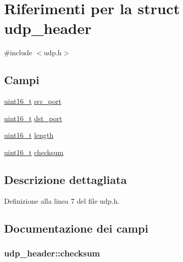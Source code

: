 \hypertarget{structudp__header}{\section{Riferimenti per la struct udp\+\_\+header}
\label{structudp__header}
}


{\ttfamily \#include $<$udp.\+h$>$}

\subsection*{Campi}
\begin{DoxyCompactItemize}
\item 
\hyperlink{aplus_8h_a5a8b2dc9e45a9ee81a94ef304fb62505}{uint16\+\_\+t} \hyperlink{structudp__header_ac0f7a492b8b7dd8e425d6517c7e9b3c2}{src\+\_\+port}
\item 
\hyperlink{aplus_8h_a5a8b2dc9e45a9ee81a94ef304fb62505}{uint16\+\_\+t} \hyperlink{structudp__header_a0cabb64601f3523a8defb137a90da96a}{dst\+\_\+port}
\item 
\hyperlink{aplus_8h_a5a8b2dc9e45a9ee81a94ef304fb62505}{uint16\+\_\+t} \hyperlink{structudp__header_a8129128b23a79dad769fc422f7b1c12b}{length}
\item 
\hyperlink{aplus_8h_a5a8b2dc9e45a9ee81a94ef304fb62505}{uint16\+\_\+t} \hyperlink{structudp__header_ad0ffcddf83678ff1305300db0dac33c5}{checksum}
\end{DoxyCompactItemize}


\subsection{Descrizione dettagliata}


Definizione alla linea 7 del file udp.\+h.



\subsection{Documentazione dei campi}
\hypertarget{structudp__header_ad0ffcddf83678ff1305300db0dac33c5}{
\subsubsection[{checksum}]{ udp\+\_\+header\+::checksum}}\label{structudp__header_ad0ffcddf83678ff1305300db0dac33c5}



